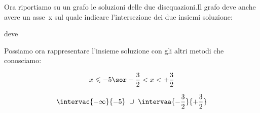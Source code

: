\begin{esempio}
Ora riportiamo su un grafo le soluzioni delle due disequazioni.Il grafo deve 
anche avere un asse~x sul quale indicare l'intersezione dei due insiemi 
soluzione:
\begin{center} \sistemaa \end{center}
% 
% 
% 
% 
% 
deve 

Possiamo ora rappresentare l'insieme soluzione con gli altri metodi che 
conosciamo:

\begin{minipage}{.49 \linewidth}
\[x \leqslant -5 \sor -\dfrac{3}{2} < x < +\dfrac{3}{2}\]
\end{minipage}
\hfill
\begin{minipage}{.49 \linewidth}
\[\intervac{-\infty}{-5}~\cup~\intervaa{-\dfrac{3}{2}}{+\dfrac{3}{2}}\]
\end{minipage}
\end{esempio}


